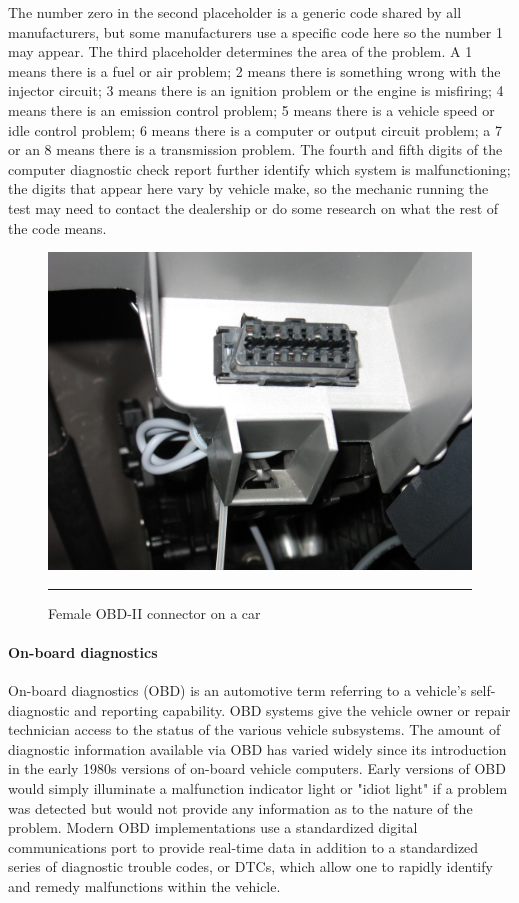 The number zero in the second placeholder is a generic code shared by all manufacturers, but some manufacturers use a specific code here so the number 1 may appear. The third placeholder determines the area of the problem. A 1 means there is a fuel or air problem; 2 means there is something wrong with the injector circuit; 3 means there is an ignition problem or the engine is misfiring; 4 means there is an emission control problem; 5 means there is a vehicle speed or idle control problem; 6 means there is a computer or output circuit problem; a 7 or an 8 means there is a transmission problem. The fourth and fifth digits of the computer diagnostic check report further identify which system is malfunctioning; the digits that appear here vary by vehicle make, so the mechanic running the test may need to contact the dealership or do some research on what the rest of the code means.\cite{7}
\begin{figure}[h!]
  \centering
    \includegraphics[width=1\textwidth]{./Pictures/OBD_002.jpg}
  \rule{1\textwidth}{1pt}
 \caption{Female OBD-II connector on a car}
\end{figure}

\paragraph*{On-board diagnostics}
\hfill \break
On-board diagnostics (OBD) is an automotive term referring to a vehicle's self-diagnostic and reporting capability. OBD systems give the vehicle owner or repair technician access to the status of the various vehicle subsystems. The amount of diagnostic information available via OBD has varied widely since its introduction in the early 1980s versions of on-board vehicle computers. Early versions of OBD would simply illuminate a malfunction indicator light or "idiot light" if a problem was detected but would not provide any information as to the nature of the problem. Modern OBD implementations use a standardized digital communications port to provide real-time data in addition to a standardized series of diagnostic trouble codes, or DTCs, which allow one to rapidly identify and remedy malfunctions within the vehicle.\cite{7}

